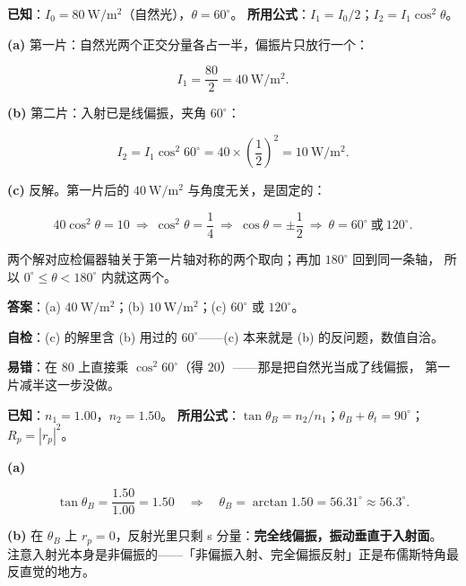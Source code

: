 \documentclass[11pt]{ctexart}
\let\hdrorig\hdr
\renewcommand{\hdr}[2]{\needspace{8\baselineskip}\hdrorig{#1}{#2}}
\begin{document}


\textbf{已知}：$I_0=80\ \mathrm{W/m^2}$（自然光），$\theta=60^\circ$。
\textbf{所用公式}：$I_1=I_0/2$；$I_2=I_1\cos^2\theta$。

\textbf{(a)} 第一片：自然光两个正交分量各占一半，偏振片只放行一个：

\[
I_1=\frac{80}{2}=40\ \mathrm{W/m^2}.
\]

\textbf{(b)} 第二片：入射已是线偏振，夹角 $60^\circ$：

\[
I_2=I_1\cos^2 60^\circ=40\times\left(\frac12\right)^2=10\ \mathrm{W/m^2}.
\]

\textbf{(c)} 反解。第一片后的 $40\ \mathrm{W/m^2}$ 与角度无关，是固定的：

\[
40\cos^2\theta=10\ \Longrightarrow\ \cos^2\theta=\frac14
\ \Longrightarrow\ \cos\theta=\pm\frac12
\ \Longrightarrow\ \theta=60^\circ\ \text{或}\ 120^\circ .
\]

两个解对应检偏器轴关于第一片轴对称的两个取向；再加 $180^\circ$ 回到同一条轴，
所以 $0^\circ\le\theta<180^\circ$ 内就这两个。

\textbf{答案}：(a) $40\ \mathrm{W/m^2}$；(b) $10\ \mathrm{W/m^2}$；(c) $60^\circ$ 或 $120^\circ$。

\textbf{自检}：(c) 的解里含 (b) 用过的 $60^\circ$——(c) 本来就是 (b) 的反问题，数值自洽。

\textbf{易错}：在 $80$ 上直接乘 $\cos^2 60^\circ$（得 $20$）——那是把自然光当成了线偏振，
第一片减半这一步没做。


\textbf{已知}：$n_1=1.00$，$n_2=1.50$。
\textbf{所用公式}：$\tan\theta_B=n_2/n_1$；$\theta_B+\theta_t=90^\circ$；$R_p=|r_p|^2$。

\textbf{(a)}

\[
\tan\theta_B=\frac{1.50}{1.00}=1.50
\quad\Longrightarrow\quad
\theta_B=\arctan1.50=56.31^\circ\approx56.3^\circ .
\]

\textbf{(b)} 在 $\theta_B$ 上 $r_p=0$，反射光里只剩 s 分量：\textbf{完全线偏振，振动垂直于入射面}。
注意入射光本身是非偏振的——「非偏振入射、完全偏振反射」正是布儒斯特角最反直觉的地方。
\end{document}
